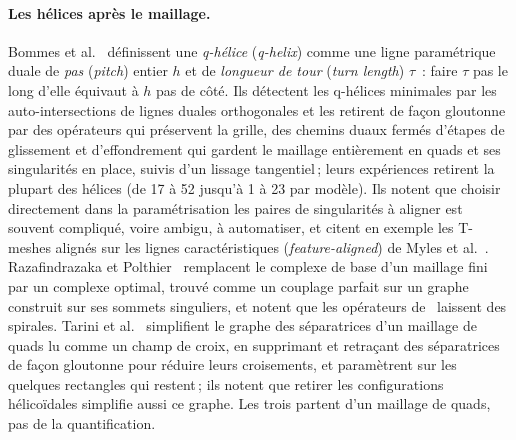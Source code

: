 \documentclass[11pt,a4paper]{article}
\begin{document}
\paragraph{Les hélices après le maillage.}
Bommes et al.~\cite{bommes2011structure} définissent une \emph{q-hélice}
(\emph{q-helix}) comme une ligne paramétrique duale de \emph{pas}
(\emph{pitch}) entier $h$ et de \emph{longueur de tour} (\emph{turn length})
$\tau$~: faire $\tau$ pas le long d'elle équivaut à $h$ pas de côté. Ils
détectent les q-hélices minimales par les auto-intersections de lignes
duales orthogonales et les retirent de façon gloutonne par des opérateurs
qui préservent la grille, des chemins duaux fermés d'étapes de glissement
et d'effondrement qui gardent le maillage entièrement en quads et ses
singularités en place, suivis d'un lissage tangentiel\,; leurs expériences
retirent la plupart des hélices (de 17 à 52 jusqu'à 1 à 23 par modèle). Ils
notent que choisir directement dans la paramétrisation les paires de
singularités à aligner est souvent compliqué, voire ambigu, à automatiser,
et citent en exemple les T-meshes alignés sur les lignes caractéristiques
(\emph{feature-aligned}) de Myles et al.~\cite{myles2010feature}. Razafindrazaka et Polthier~\cite{razafindrazaka2017optimal}
remplacent le complexe de base d'un maillage fini par un complexe optimal,
trouvé comme un couplage parfait sur un graphe construit sur ses sommets
singuliers, et notent que les opérateurs de~\cite{bommes2011structure}
laissent des spirales. Tarini et al.~\cite{tarini2011simple} simplifient le
graphe des séparatrices d'un maillage de quads lu comme un champ de croix, en
supprimant et retraçant des séparatrices de façon gloutonne pour réduire
leurs croisements, et paramètrent sur les quelques rectangles qui restent\,;
ils notent que retirer les configurations hélicoïdales simplifie aussi ce
graphe. Les trois partent d'un maillage de quads, pas de la quantification.
\end{document}
